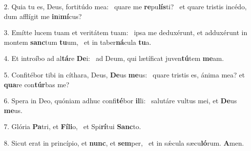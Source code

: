 2. Quia tu es, Deus, fortitúdo mea: \dag\  quare me \textbf{re}pu\textbf{lís}ti? \ast\  et quare tristis incédo, dum afflígit me \textbf{in}i\textbf{mí}cus?\

3. Emítte lucem tuam et veritátem tuam: \dag\  ipsa me deduxérunt, et adduxérunt in montem \textbf{sanc}tum \textbf{tu}um, \ast\  et in taber\textbf{ná}cula \textbf{tu}a.\

4. Et introíbo ad al\textbf{tá}re \textbf{De}i: \ast\  ad Deum, qui lætíficat juven\textbf{tú}tem \textbf{me}am.\

5. Confitébor tibi in cíthara, Deus, \textbf{De}us \textbf{me}us: \ast\  quare tristis es, ánima mea? et \textbf{qua}re con\textbf{túr}bas me?\

6. Spera in Deo, quóniam adhuc confi\textbf{té}bor \textbf{il}li: \ast\  salutáre vultus mei, et \textbf{De}us \textbf{me}us.\

7. Glória \textbf{Pa}tri, et \textbf{Fí}\textbf{li}o, \ast\  et Spi\textbf{rí}tui \textbf{Sanc}to.\

8. Sicut erat in princípio, et \textbf{nunc}, et \textbf{sem}per, \ast\  et in sǽcula sæcu\textbf{ló}rum. \textbf{A}men.\

